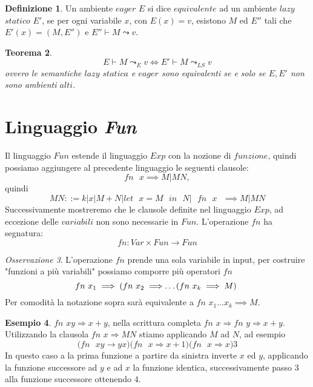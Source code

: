 \documentclass{article}
\newtheorem{theorem}{Teorema}[section]
\theoremstyle{definition}
\theoremstyle{definition}
\theoremstyle{definition}
\newtheorem{definition}[theorem]{Definizione}
\newtheorem{example}[theorem]{Esempio}
\theoremstyle{remark}
\newtheorem{remark}[theorem]{Osservazione}
\begin{document}
\begin{definition}
    Un ambiente $eager$ $E$ si dice $equivalente$ ad un ambiente $lazy$ $statico$ $E'$, se per ogni variabile $x$,  con $E(x)=v$, esistono $M$ ed $E''$ tali che $E'(x) = (M,E'')$ e $E''\vdash M \leadsto v$.
\end{definition}
\begin{theorem}
    $$E\vdash M \leadsto_E v \iff E' \vdash M \leadsto_{LS} v$$
    ovvero le semantiche $lazy$ $statica$ e $eager$ sono equivalenti se e solo se $E,E'$ non sono ambienti $alti$.
\end{theorem}
\section{Linguaggio \textit{Fun}}
Il linguaggio $Fun$ estende il linguaggio $Exp$ con la nozione di $funzione$, quindi possiamo aggiungere al precedente linguaggio le seguenti clausole:
$$ \text{$fn$ $x$} \implies M|MN,$$
quindi
$$MN ::= k|x|M+N|\text{$let$ $x=M$ $in$ $N|$ $fn$ $x$ }\implies M|MN$$
Successivamente mostreremo che le clausole definite nel linguaggio $Exp$, ad eccezione delle $variabili$ non sono necessarie in $Fun$. L'operazione $fn$ ha segnatura:
$$fn: Var\times Fun \to Fun$$
\begin{remark}
    L'operazione $fn$ prende una sola variabile in input, per costruire "funzioni a più variabili" possiamo comporre più operatori $fn$
    $$\text{$fn$ $x_1 \implies (fn$ $x_2\implies$\dots($fn$ $x_k\implies M$) }$$
    Per comodità la notazione sopra sarà equivalente a $fn$ $x_1\dots x_k\implies M$.
\end{remark}
\begin{example}
    $fn$ $xy\Rightarrow x+y$, nella scrittura completa $fn$ $x\Rightarrow fn$ $y\Rightarrow x+y$.
    Utilizzando la clausola $fn$ $x\Rightarrow MN$ stiamo applicando $M$ ad $N$, ad esempio
    $$\text{$(fn$ $xy\rightarrow yx)$$(fn$ $x\Rightarrow x+1)$$(fn$ $x\Rightarrow x)3$}$$
    In questo caso a la prima funzione a partire da sinistra inverte $x$ ed $y$, applicando la funzione successore ad $y$ e ad $x$ la funzione identica, successivamente passo $3$ alla funzione successore ottenendo $4$.
\end{example}
\end{document}
